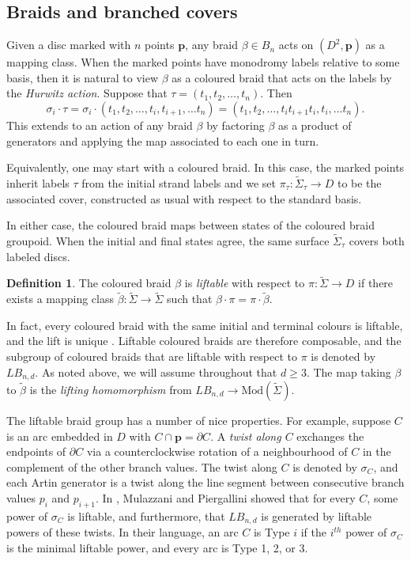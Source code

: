 \documentclass{amsart}
\theoremstyle{definition}
\newtheorem{definition}[theorem]{Definition}
\def\ws{\widetilde{\Sigma}}
\begin{document}
  \subsection{Braids and branched covers}\label{sec:braids}
  
  Given a  disc marked with $n$ points  $\mathbf{p}$, any braid $\beta\in B_{n}$ acts on $(D^2, \mathbf{p})$ as a mapping class.  When the marked points have monodromy labels relative to some basis, then it is natural to view $\beta$ as a coloured braid that acts on the labels by the \textit{Hurwitz action}. Suppose that $\tau=(t_1,t_2, \dots, t_n)$.  Then
  \[\sigma_i\cdot \tau=\sigma_i\cdot(t_1, t_2, \dots, t_i, t_{i+1}, \dots t_n)=(t_1, t_2, \dots, t_i t_{i+1} t_i, t_{i}, \dots t_n).\]  
     This extends to an action of any braid $\beta$ by factoring $\beta$ as a product of generators and applying the map associated to each one in turn.  
     
     Equivalently, one may start with a coloured braid.  In this case, the marked points inherit labels $\tau$ from the initial strand labels and we set $\pi_\tau:\ws_\tau \rightarrow D$ to be the associated cover, constructed as usual with respect to the standard basis. 
     
In either case, the coloured braid maps between states of the coloured braid groupoid.  When the initial and final states agree, the same surface $\ws_\tau$ covers both labeled discs.  


\begin{definition} The coloured braid $\beta$ is \textit{liftable} with respect to $\pi:\ws\rightarrow D$ if there exists a mapping class $\widetilde{\beta}: \ws\rightarrow \ws$ such that $\beta\cdot \pi=\pi\cdot \widetilde{\beta}$.   
\end{definition}

In fact, every coloured braid with the same initial and terminal colours is liftable, and the lift is unique \cite{MP}.  Liftable coloured braids are therefore composable, and the subgroup of coloured braids that are liftable with respect to $\pi$ is denoted by $LB_{n,d}$.   As noted above, we will assume throughout that $d\geq 3$.  The map taking $\beta$ to $\widetilde{\beta}$ is the \textit{lifting homomorphism} from $LB_{n,d}\rightarrow  \text{Mod}(\ws)$. 

The  liftable braid group has a number of nice properties.  For example, suppose $C$ is an arc embedded in $D$ with $C\cap \mathbf{p}=\partial C$.  A \textit{twist along $C$} exchanges the endpoints of $\partial C$ via a counterclockwise rotation of a neighbourhood of $C$ in the complement of the other branch values.  The twist along $C$ is denoted by $\sigma_C$, and each Artin generator is a twist along the line segment between consecutive branch values $p_i$ and $p_{i+1}$.   In \cite{MP}, Mulazzani and Piergallini showed that for every $C$, some power of $\sigma_C$ is liftable, and furthermore, that $LB_{n,d}$ is generated by liftable powers of these twists.  In their language, an arc $C$ is Type $i$ if the $i^{th}$ power of $\sigma_C$ is the minimal liftable power, and every arc is Type 1, 2, or 3.  
\end{document}

